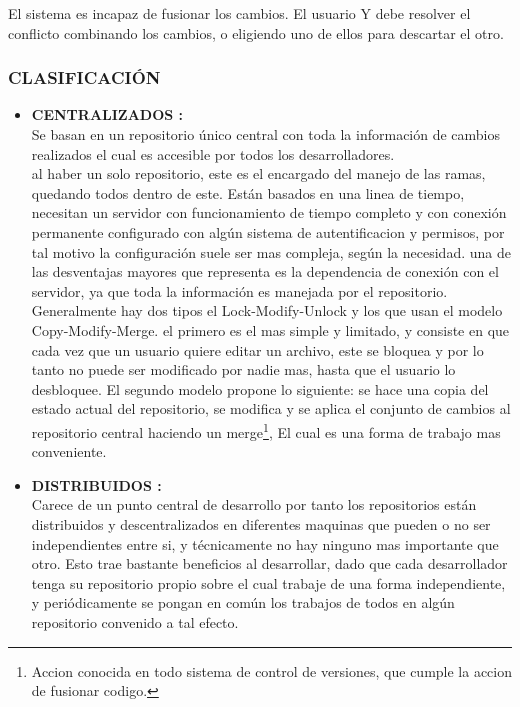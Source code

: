 El sistema es incapaz de fusionar los cambios. El usuario Y debe resolver el conflicto combinando los cambios, o eligiendo uno de ellos para descartar el otro.

\subsubsection{CLASIFICACIÓN}

\begin{itemize}
\item \textbf{CENTRALIZADOS :}\\
Se basan en un repositorio único central con toda la información de cambios realizados el cual es accesible por todos los desarrolladores.\\
al haber un solo repositorio, este es el encargado del manejo de las ramas, quedando todos dentro de este. Están basados en una linea de tiempo, necesitan un servidor con funcionamiento de tiempo completo y con conexión permanente
configurado con algún sistema de autentificacion y permisos, por tal motivo la configuración suele ser mas compleja, según la necesidad. 
una de las desventajas mayores que representa es la dependencia de conexión con el servidor, ya que toda la información es manejada por el repositorio.\\
Generalmente hay dos tipos el Lock-Modify-Unlock y los que usan el modelo Copy-Modify-Merge. el primero es el mas simple y limitado, y consiste en que cada vez que un usuario quiere editar un archivo, este se bloquea y por lo tanto no puede ser
modificado por nadie mas, hasta que el usuario lo desbloquee. El segundo modelo propone lo siguiente: se hace una copia del estado actual del repositorio, se modifica y se aplica el conjunto de cambios al repositorio central haciendo un merge\footnote{Accion conocida en todo sistema de control de versiones, que cumple la accion de fusionar codigo.}, El cual es una forma de trabajo mas conveniente.
\item \textbf{DISTRIBUIDOS :}\\
Carece de un punto central de desarrollo por tanto los repositorios están distribuidos y descentralizados en diferentes maquinas que pueden o no ser independientes entre si, y 
técnicamente no hay ninguno mas importante que otro. Esto trae bastante beneficios al desarrollar, dado que cada desarrollador tenga su repositorio propio sobre el cual trabaje de una forma independiente, y periódicamente se pongan en común los trabajos de todos en algún repositorio convenido a tal efecto.


\end{itemize}
